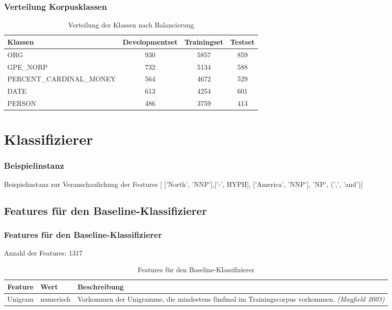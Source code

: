 \documentclass{beamer}
\begin{document}
	\begin{frame}
			\frametitle{Verteilung Korpusklassen}
			 \begin{table}
			 	\caption{Verteilung der Klassen nach Balancierung}
			 	\begin{tabular}{lccc}
			 		\toprule
			 		Klassen  & Developmentset & Trainingset & Testset \\
			 		\midrule
			 		ORG  & 930 & 5857 & 859 \\
			 		GPE\_NORP & 732 & 5134 & 588 \\
			 		PERCENT\_CARDINAL\_MONEY & 564 & 4672 & 529 \\
			 		DATE & 613 & 4254 & 601 \\	 		
			 		PERSON & 486 & 3759 & 413 \\
			 		\bottomrule
			 	\end{tabular}
			 	\label{tab:datasets}
			 \end{table}
	\end{frame}


\section{Klassifizierer}
	\begin{frame}
		\frametitle{Beispielinstanz}
		\begin{exampleblock}{Beispielinstanz zur Veranschaulichung der Features}
		[ ['North', 'NNP'],['-', HYPH], ['America', 'NNP'], 'NP', (',', 'and')]
	\end{exampleblock}
		
	\end{frame}
	\subsection{Features für den Baseline-Klassifizierer}
	\begin{frame}
		\frametitle{Features für den Baseline-Klassifizierer}
		Anzahl der Features: 1317
					 \begin{table}
					 	\caption{Features für den Baseline-Klassifizierer}
					 	\begin{tabularx}{\textwidth}{llX}
					 		\toprule
							Feature & Wert & Beschreibung\\
					 		\midrule
					 		Unigram & numerisch & Vorkommen der Unigramme, die mindestens fünfmal im Trainingscorpus vorkommen. \textit{(Mayfield 2003)} \\
					 		\bottomrule
					 	\end{tabularx}
					 	\label{tab:baselinef}
					 \end{table}
	\end{frame}
\end{document}
